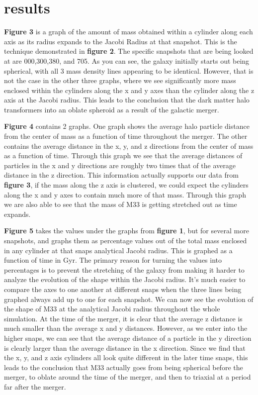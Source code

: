 \documentclass[fleqn,usenatbib]{mnras}
\begin{document}
\section{results}

\textbf{Figure 3} is a graph of the amount of mass obtained within a cylinder along each axis as its radius expands to the Jacobi Radius at that snapshot. This is the technique demonstrated in \textbf{figure 2}. The specific snapshots that are being looked at are 000,300,380, and 705. As you can see, the galaxy initially starts out being spherical, with all 3 mass density lines appearing to be identical. However, that is not the case in the other three graphs, where we see significantly more mass enclosed within the cylinders along the x and y axes than the cylinder along the z axis at the Jacobi radius. This leads to the conclusion that the dark matter halo transformers into an oblate spheroid as a result of the galactic merger.

\textbf{Figure 4} contains 2 graphs. One graph shows the average halo particle distance from the center of mass as a function of time throughout the merger. The other contains the average distance in the x, y, and z directions from the center of mass as a function of time. Through this graph we see that the average distances of particles in the x and y directions are roughly two times that of the average distance in the z direction. This information actually supports our data from \textbf{figure 3}, if the mass along the z axis is clustered, we could expect the cylinders along the x and y axes to contain much more of that mass. Through this graph we are also able to see that the mass of M33 is getting stretched out as time expands.

\textbf{Figure 5} takes the values under the graphs from \textbf{figure 1}, but for several more snapshots, and graphs them as percentage values out of the total mass enclosed in any cylinder at that snaps analytical Jacobi radius. This is graphed as a function of time in Gyr. The primary reason for turning the values into percentages is to prevent the stretching of the galaxy from making it harder to analyze the evolution of the shape within the Jacobi radius. It’s much easier to compare the axes to one another at different snaps when the three lines being graphed always add up to one for each snapshot. We can now see the evolution of the shape of M33 at the analytical Jacobi radius throughout the whole simulation. At the time of the merger, it is clear that the average z distance is much smaller than the average x and y distances. However, as we enter into the higher snaps, we can see that the average distance of a particle in the y direction is clearly larger than the average distance in the x direction. Since we find that the x, y, and z axis cylinders all look quite different in the later time snaps, this leads to the conclusion that M33 actually goes from being spherical before the merger, to oblate around the time of the merger, and then to triaxial at a period far after the merger.
\end{document}
